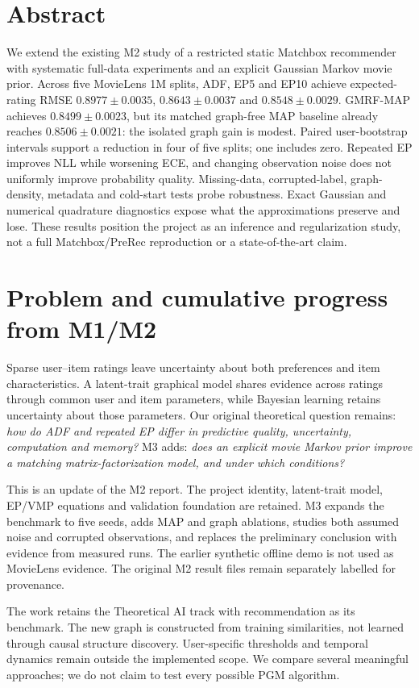 \documentclass[12pt,a4paper]{article}
\begin{document}
\section*{Abstract}
We extend the existing M2 study of a restricted static Matchbox recommender
with systematic full-data experiments and an explicit Gaussian Markov movie
prior. Across five MovieLens 1M splits, ADF, EP5 and EP10 achieve expected-rating
RMSE $0.8977\pm0.0035$, $0.8643\pm0.0037$ and $0.8548\pm0.0029$.
GMRF-MAP achieves $0.8499\pm0.0023$, but its matched graph-free MAP baseline
already reaches $0.8506\pm0.0021$: the isolated graph gain is modest.
Paired user-bootstrap intervals support a reduction in four of five splits;
one includes zero. Repeated EP improves NLL while worsening ECE, and changing
observation noise does not uniformly improve probability quality.
Missing-data, corrupted-label, graph-density, metadata and cold-start tests
probe robustness. Exact Gaussian and numerical quadrature diagnostics expose
what the approximations preserve and lose. These results position the project
as an inference and regularization study, not a full Matchbox/PreRec
reproduction or a state-of-the-art claim.

\section{Problem and cumulative progress from M1/M2}
Sparse user--item ratings leave uncertainty about both preferences and item
characteristics. A latent-trait graphical model shares evidence across ratings
through common user and item parameters, while Bayesian learning retains
uncertainty about those parameters. Our original theoretical question remains:
\emph{how do ADF and repeated EP differ in predictive quality, uncertainty,
computation and memory?} M3 adds: \emph{does an explicit movie Markov prior
improve a matching matrix-factorization model, and under which conditions?}

This is an update of the M2 report. The project identity, latent-trait model,
EP/VMP equations and validation foundation are retained. M3 expands the
benchmark to five seeds, adds MAP and graph ablations, studies both assumed
noise and corrupted observations, and replaces the preliminary conclusion
with evidence from measured runs. The earlier synthetic offline demo is not
used as MovieLens evidence. The original M2 result files remain separately
labelled for provenance.

The work retains the Theoretical AI track with recommendation as its benchmark.
The new graph is constructed from training similarities, not learned through
causal structure discovery. User-specific thresholds and temporal dynamics
remain outside the implemented scope. We compare several meaningful approaches;
we do not claim to test every possible PGM algorithm.
\end{document}
